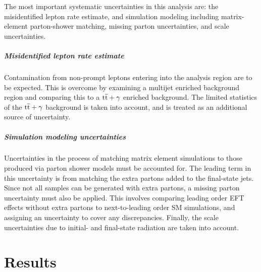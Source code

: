 \documentclass[12pt]{article}
\begin{document}
The most important systematic uncertainties in this analysis are: the misidentified lepton rate estimate, and simulation modeling including  matrix-element parton-shower matching, missing parton uncertainties, and scale uncertainties.

\subparagraph{Misidentified lepton rate estimate}

Contamination from non-prompt leptons entering into the analysis region are to be expected. This is overcome by examining a multijet enriched background region and comparing this to a $\mathrm{t\overline{t}}+\gamma$ enriched background. The limited statistics of the $\mathrm{t\overline{t}}+\gamma$ background is taken into account, and is treated as an additional source of uncertainty.

\subparagraph{Simulation modeling uncertainties}

Uncertainties in the process of matching matrix element simulations to those produced via parton shower models must be accounted for. The leading term in this uncertainty is from matching the extra partons added to the final-state jets. Since not all samples can be generated with extra partons, a missing parton uncertainty must also be applied. This involves comparing leading order EFT effects without extra partons to next-to-leading order SM simulations, and assigning an uncertainty to cover any discrepancies. Finally, the scale uncertainties due to initial- and final-state radiation are taken into account.

\section{Results}
\end{document}
